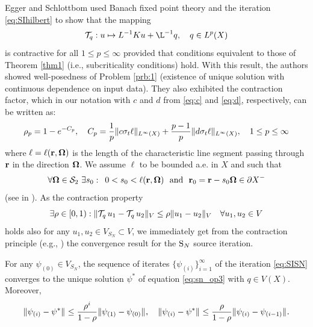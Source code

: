 Egger and Schlottbom \cite{Egger} used Banach fixed point theory and the iteration \eqref{eq:SIhilbert} to show that the 
mapping $$ \mathcal{T}_q : u \mapsto L^{-1}K u + \L^{-1} q, \quad q \in \Lp(X)$$ is contractive for all $1
\leq p \leq \infty$ provided that conditions equivalent to those of Theorem \ref{thm1} (i.e., subcriticality
conditions) hold. With this result, the authors showed well-posedness of Problem \ref{prb:1} (existence of
unique solution with continuous dependence on input data). 
They also exhibited the contraction factor, which in our notation with $c$ and $d$ from \eqref{eq:c} and
\eqref{eq:d}, respectively, can be written as:
\begin{equation}\label{eq:contraction_factor}
	\rho_p = 1 - e^{-C_p}, \quad C_p = \frac{1}{p}\norm[{\Lp[\infty](X)}]{c\sigma_t\ell} +
	\frac{p-1}{p}\norm[{\Lp[\infty](X)}]{d\sigma_t\ell}, \quad 1 \leq p \leq \infty
\end{equation}
where $\ell = \ell(\br,\bomega)$ is the length of the characteristic line segment passing through $\br$ in the
direction $\bomega$. We assume $\ell$ to be bounded a.e. in $X$ and such that
$$
	\forall \bomega \in \Sphere\ \exists s_0:\ \, 0 < s_0 < \ell(\br,\bomega)\ \mbox{ and }\ \br_0 = \br - s_0 \bomega \in
	\pX[-]
$$
(see  in ).
As the contraction property
$$
\exists \rho \in [0, 1): \norm[V]{\mathcal{T}_q\, u_1 - \mathcal{T}_q\, u_2} \leq \rho \norm[V]{u_1 - u_2}\quad
\forall u_1,u_2 \in V $$
holds also for any $u_1,u_2\in V_{S_N} \subset V$, we immediately get from the contraction principle (e.g., \cite[Thm.
2.3.1]{DrabekNFA}) the convergence result for the $\SN$ source iteration. 
\begin{theorem}\label{thm:3}
	For any $\psi_{(0)} \in V_{S_N}$, the sequence of iterates $\{\psi_{(i)}\}_{i=1}^{\infty}$ of the iteration
	\eqref{eq:SISN} converges to the unique solution $\psi^*$ of equation \eqref{eq:sn_op3} with $q \in V(X)$. 
	Moreover, 
	$$
		\norm{\psi_{(i)} - \psi^*} \leq \frac{\rho^{i}}{1-\rho} \norm{\psi_{(1)} - \psi_{(0)}},\quad
		\norm{\psi_{(i)} - \psi^*} \leq \frac{\rho}{1-\rho} \norm{\psi_{(i)} - \psi_{(i-1)}}.
	$$   
\end{theorem}

